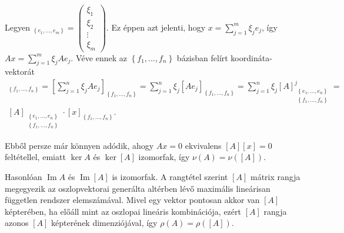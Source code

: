 \documentclass[9pt, showtrims]{memoir}
\makeatletter
\renewenvironment{proof}[1][\proofname]
    {\par\pushQED{\qed}%
    \normalfont \topsep6\p@\@plus6\p@\relax
    \trivlist
    \item[\hskip\labelsep
        \itshape
    #1\@addpunct{:}]\ignorespaces}
    {\popQED\endtrivlist\@endpefalse}
\theoremstyle{plain}
\theoremstyle{remark}
\theoremstyle{definition}
\DeclareMathOperator{\im}{Im}
\makeatother
\begin{document}
\begin{proof}
    Legyen 
    \begin{math}
        [x]_{\left\{ e_1,\dots,e_m \right\}}
        =
        \begin{pmatrix}
            \xi_1\\ \xi_2 \\ \vdots \\ \xi_m
        \end{pmatrix}.
    \end{math}
    Ez éppen azt jelenti, 
    hogy $x=\sum_{j=1}^m\xi_je_j$, így 
    $Ax=\sum_{j=1}^m\xi_jAe_j$.
    Véve ennek az $\left\{ f_1,\dots,f_n \right\}$ bázisban felírt koordináta-vektorát 
    \begin{multline*}
        [Ax]_{\left\{ f_1,\dots,f_n \right\}}
        =
        \left[ \sum_{j=1}^n\xi_jAe_j \right]_{\left\{ f_1,\dots,f_n \right\}}
        =
        \sum_{j=1}^n\xi_j[Ae_j]_{\left\{ f_1,\dots,f_n \right\}}
        =
        \sum_{j=1}^n\xi_j[A]_{\substack{\left\{ e_1,\dots,e_n \right\}\\ \left\{ f_1,\dots,f_n \right\}}}^j
        =\\
        [A]_{\substack{\left\{ e_1,\dots,e_n \right\}\\ \left\{ f_1,\dots,f_n \right\}}}
        \cdot 
        [x]_{\left\{ f_1,\dots,f_n \right\}}.
    \end{multline*}

    Ebből persze már könnyen adódik, ahogy $Ax=0$ ekvivalens $[A][x]=0$ feltétellel, emiatt 
    $\ker A$ és $\ker [A]$ izomorfak, 
    így $\nu(A)=\nu([A])$.

    Hasonlóan $\im A$ és $\im [A]$ is izomorfak.
    A rangtétel szerint $[A]$ mátrix rangja megegyezik az oszlopvektorai generálta altérben lévő maximális lineárisan
    független rendszer elemszámával.
    Mivel egy vektor pontosan akkor van $[A]$ képterében, ha előáll mint az oszlopai lineáris kombinációja,
    ezért $[A]$ rangja azonos $[A]$ képterének dimenziójával, 
    így $\rho(A)=\rho([A])$.
\end{proof}
\end{document}
